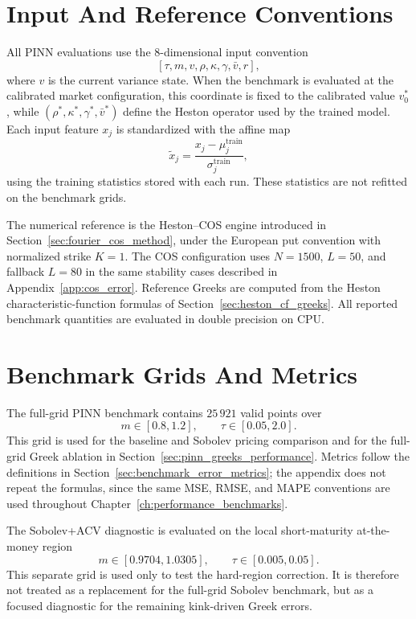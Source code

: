 \section{Input And Reference Conventions}

All PINN evaluations use the 8-dimensional input convention
\[
\left[\tau, m, v, \rho, \kappa, \gamma, \bar v, r\right],
\]
where \(v\) is the current variance state. When the benchmark is evaluated at the calibrated market configuration, this coordinate is fixed to the calibrated value \(v_0^*\), while \((\rho^*,\kappa^*,\gamma^*,\bar v^*)\) define the Heston operator used by the trained model. Each input feature \(x_j\) is standardized with the affine map
\[
\tilde{x}_j=\frac{x_j-\mu_j^{\mathrm{train}}}{\sigma_j^{\mathrm{train}}},
\]
using the training statistics stored with each run. These statistics are not refitted on the benchmark grids.

The numerical reference is the Heston--COS engine introduced in Section~\ref{sec:fourier_cos_method}, under the European put convention with normalized strike \(K=1\). The COS configuration uses \(N=1500\), \(L=50\), and fallback \(L=80\) in the same stability cases described in Appendix~\ref{app:cos_error}. Reference Greeks are computed from the Heston characteristic-function formulas of Section~\ref{sec:heston_cf_greeks}. All reported benchmark quantities are evaluated in double precision on CPU.

\section{Benchmark Grids And Metrics}

The full-grid PINN benchmark contains \(25\,921\) valid points over
\[
m\in[0.8,1.2],\qquad \tau\in[0.05,2.0].
\]
This grid is used for the baseline and Sobolev pricing comparison and for the full-grid Greek ablation in Section~\ref{sec:pinn_greeks_performance}. Metrics follow the definitions in Section~\ref{sec:benchmark_error_metrics}; the appendix does not repeat the formulas, since the same MSE, RMSE, and MAPE conventions are used throughout Chapter~\ref{ch:performance_benchmarks}.

The Sobolev+ACV diagnostic is evaluated on the local short-maturity at-the-money region
\[
m\in[0.9704,1.0305],\qquad \tau\in[0.005,0.05].
\]
This separate grid is used only to test the hard-region correction. It is therefore not treated as a replacement for the full-grid Sobolev benchmark, but as a focused diagnostic for the remaining kink-driven Greek errors.
